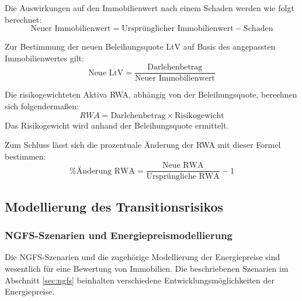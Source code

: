 Die Auswirkungen auf den Immobilienwert nach einem Schaden werden wie folgt berechnet:
\begin{equation}
    \text{Neuer Immobilienwert} = \text{Ursprünglicher Immobilienwert} - \text{Schaden}
\end{equation}

Zur Bestimmung der neuen Beleihungsquote \ac{LtV} auf Basis des angepassten Immobilienwertes gilt:
\begin{equation}
    \text{Neue LtV} = \frac{\text{Darlehenbetrag}}{\text{Neuer Immobilienwert}}
\end{equation}

Die risikogewichteten Aktiva \acs{RWA}, abhängig von der Beleihungsquote, berechnen sich folgendermaßen:
\begin{equation}
    RWA = \text{Darlehenbetrag} \times \text{Risikogewicht}
\end{equation}
Das Risikogewicht wird anhand der Beleihungsquote ermittelt.

Zum Schluss lässt sich die prozentuale Änderung der \acs{RWA} mit dieser Formel bestimmen:
\begin{equation}
    \% \text{Änderung RWA} = \frac{\text{Neue RWA}}{\text{Ursprüngliche RWA}} - 1
\end{equation}
\subsection{Modellierung des Transitionsrisikos}
\subsubsection{NGFS-Szenarien und Energiepreismodellierung}
Die \ac{NGFS}-Szenarien und die zugehörige Modellierung der Energiepreise sind wesentlich für eine Bewertung von Immobilien. Die beschriebenen Szenarien im Abschnitt \ref{sec:ngfs} beinhalten verschiedene Entwicklungsmöglichkeiten der Energiepreise.

